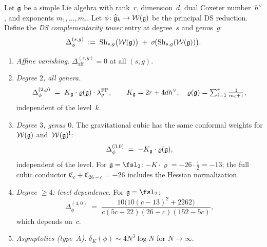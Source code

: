 \begin{theorem}
\label{thm:ds-complementarity-tower}
Let $\mathfrak{g}$ be a simple Lie algebra with rank~$r$, dimension~$d$,
dual Coxeter number~$h^\vee$, and exponents $m_1, \ldots, m_r$.
Let $\phi\colon \widehat{\mathfrak{g}}_k \to \mathcal{W}(\mathfrak{g})$ be
the principal DS reduction.
Define the \emph{DS complementarity tower} entry at degree~$s$
and genus~$g$:
\begin{equation}\label{eq:ds-tower-def}
\Delta_\phi^{(s,g)}
\;:=\;
\mathrm{Sh}_{s,g}\bigl(\mathcal{W}(\mathfrak{g})\bigr)
\;+\;
\sigma\!\bigl(\mathrm{Sh}_{s,g}(\mathcal{W}(\mathfrak{g}))\bigr).
\end{equation}
\begin{enumerate}[label=\textup{(\roman*)}]
\item \emph{Affine vanishing.}
 $\Delta_{\mathrm{aff}}^{(s,g)} = 0$ at all $(s,g)$.

\item \emph{Degree $2$, all genera.}
 \begin{equation}\label{eq:ds-tower-degree2}
 \Delta_\phi^{(2,g)}
 \;=\;
 K_{\mathfrak{g}} \cdot \varrho(\mathfrak{g}) \cdot \lambda_g^{\mathrm{FP}},
 \qquad
 K_{\mathfrak{g}} = 2r + 4dh^\vee,
 \quad
 \varrho(\mathfrak{g}) = \textstyle\sum_{i=1}^r \frac{1}{m_i + 1},
 \end{equation}
 independent of the level~$k$.

\item \emph{Degree $3$, genus $0$.}
 The gravitational cubic has the same conformal weights for
 $\mathcal{W}(\mathfrak{g})$ and~$\mathcal{W}(\mathfrak{g})^!$:
 \begin{equation}\label{eq:ds-tower-cubic}
 \Delta_\phi^{(3,0)}
 \;=\;
 -K_{\mathfrak{g}} \cdot \varrho(\mathfrak{g}),
 \end{equation}
 independent of the level.
 For $\fg = \fsl_2$: $-K \cdot \varrho = -26 \cdot \tfrac{1}{2} = -13$;
 the full cubic conductor
 $\mathfrak{C}_c + \mathfrak{C}_{26-c} = -26$
 includes the Hessian normalization.

\item \emph{Degree $\geq 4$: level dependence.}
 For $\fg = \fsl_2$:
 \[
 \Delta_\phi^{(4,0)}
 \;=\;
 \frac{10\bigl(10(c-13)^2 + 2262\bigr)}
 {c(5c+22)(26-c)(152-5c)},
 \]
 which depends on~$c$.

\item \emph{Asymptotics \textup{(}type~$A$\textup{)}.}
 $\delta_K(\phi) \sim 4N^3 \log N$ for $N \to \infty$.
\end{enumerate}
\end{theorem}

